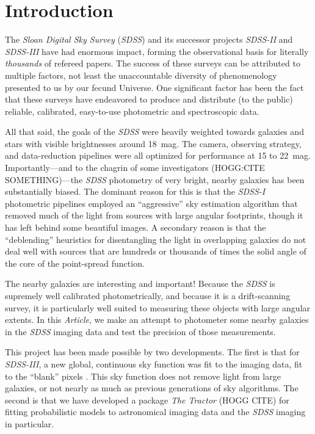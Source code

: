 \documentclass[12pt,preprint,pdftex]{aastex}
\newcommand{\project}[1]{\textsl{#1}}
\newcommand{\documentname}{\textsl{Article}}
\begin{document}
\section{Introduction}
The \project{Sloan Digital Sky Survey} (\project{SDSS}) and its
successor projects \project{SDSS-II} and \project{SDSS-III} have had
enormous impact, forming the observational basis for literally
\emph{thousands} of refereed papers.  The success of these surveys can
be attributed to multiple factors, not least the unaccountable
diversity of phenomenology presented to us by our fecund Universe.
One significant factor has been the fact that these surveys have
endeavored to produce and distribute (to the public) reliable,
calibrated, easy-to-use photometric and spectroscopic data.

All that said, the goals of the \project{SDSS} were heavily weighted
towards galaxies and stars with visible brightnesses around 18~mag.
The camera, observing strategy, and data-reduction pipelines were all
optimized for performance at 15 to 22~mag.  Importantly---and to the
chagrin of some investigators (HOGG:CITE SOMETHING)---the \project{SDSS}
photometry of very bright, nearby galaxies has been substantially
biased.  The dominant reason for this is that the \project{SDSS-I}
photometric pipelines employed an ``aggressive'' sky estimation
algorithm that removed much of the light from sources with large
angular footprints, though it has left behind some beautiful images.
A secondary reason is that the ``deblending'' heuristics for
disentangling the light in overlapping galaxies do not deal well with
sources that are hundreds or thousands of times the solid angle of the
core of the point-spread function.

The nearby galaxies are interesting and important!  Because the
\project{SDSS} is supremely well calibrated photometrically, and
because it is a drift-scanning survey, it is particularly well suited
to measuring these objects with large angular extents.  In this
\documentname, we make an attempt to photometer some nearby galaxies
in the \project{SDSS} imaging data and test the precision of those
measurements.

This project has been made possible by two developments.  The first is
that for \project{SDSS-III}, a new global, continuous sky function was
fit to the imaging data, fit to the ``blank'' pixels \citep{blanton11}.  This sky
function does not remove light from large galaxies, or not nearly as
much as previous generations of sky algorithms.  The second is that we
have developed a package \project{The Tractor} (HOGG CITE) for fitting
probabilistic models to astronomical imaging data and the
\project{SDSS} imaging in particular.
\end{document}
